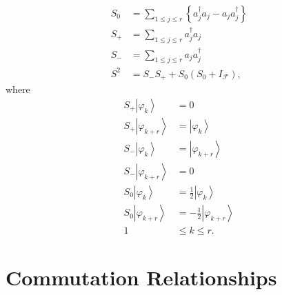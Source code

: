 \documentclass[aps,preprint]{revtex4}%
\begin{document}
\begin{align}
S_{0}  &  =\sum_{1\leq j\leq r}\left\{  a_{j}^{\dagger}a_{j}-a_{j}%
a_{j}^{\dagger}\right\} \\
S_{+}  &  =\sum_{1\leq j\leq r}a_{j}^{\dagger}a_{j}\\
S_{-}  &  =\sum_{1\leq j\leq r}a_{j}a_{j}^{\dagger}\\
S^{2}  &  =S_{-}S_{+}+S_{0}\left(  S_{0}+I_{\mathcal{F}}\right)  ,
\end{align}
where
\begin{align}
S_{+}\left\vert \varphi_{k}\right\rangle  &  =0\nonumber\\
S_{+}\left\vert \varphi_{k+r}\right\rangle  &  =\left\vert \varphi
_{k}\right\rangle \nonumber\\
S_{-}\left\vert \varphi_{k}\right\rangle  &  =\left\vert \varphi
_{k+r}\right\rangle \nonumber\\
S_{-}\left\vert \varphi_{k+r}\right\rangle  &  =0\nonumber\\
S_{0}\left\vert \varphi_{k}\right\rangle  &  =\frac{1}{2}\left\vert
\varphi_{k}\right\rangle \nonumber\\
S_{0}\left\vert \varphi_{k+r}\right\rangle  &  =-\frac{1}{2}\left\vert
\varphi_{k+r}\right\rangle \nonumber\\
1  &  \leq k\leq r.
\end{align}


\section{}

\section{Commutation Relationships}
\end{document}
